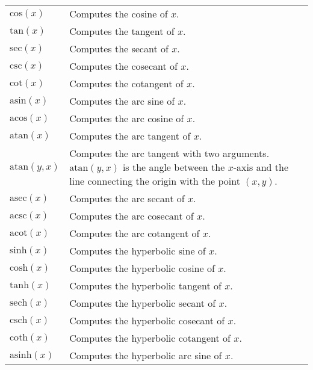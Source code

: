 \documentclass[10pt]{article}
\begin{document}
\begin{longtable}{p{}p{}}
        $ \mathrm{cos}(x) $                        & Computes the cosine of $ x $. \\
        $ \mathrm{tan}(x) $                        & Computes the tangent of $ x $. \\
        $ \mathrm{sec}(x) $                        & Computes the secant of $ x $. \\
        $ \mathrm{csc}(x) $                        & Computes the cosecant of $ x $. \\
        $ \mathrm{cot}(x) $                        & Computes the cotangent of $ x $. \\
        $ \mathrm{asin}(x) $                       & Computes the arc sine of $ x $. \\
        $ \mathrm{acos}(x) $                       & Computes the arc cosine of $ x $. \\
        $ \mathrm{atan}(x) $                       & Computes the arc tangent of $ x $. \\
        $ \mathrm{atan}(y, x) $                    & Computes the arc tangent with two arguments. $ \mathrm{atan}(y, x) $ is the angle between the $ x $-axis and the line connecting the origin with the point $ (x, y) $. \\
        $ \mathrm{asec}(x) $                       & Computes the arc secant of $ x $. \\
        $ \mathrm{acsc}(x) $                       & Computes the arc cosecant of $ x $. \\
        $ \mathrm{acot}(x) $                       & Computes the arc cotangent of $ x $. \\
        $ \mathrm{sinh}(x) $                       & Computes the hyperbolic sine of $ x $. \\
        $ \mathrm{cosh}(x) $                       & Computes the hyperbolic cosine of $ x $. \\
        $ \mathrm{tanh}(x) $                       & Computes the hyperbolic tangent of $ x $. \\
        $ \mathrm{sech}(x) $                       & Computes the hyperbolic secant of $ x $. \\
        $ \mathrm{csch}(x) $                       & Computes the hyperbolic cosecant of $ x $. \\
        $ \mathrm{coth}(x) $                       & Computes the hyperbolic cotangent of $ x $. \\
        $ \mathrm{asinh}(x) $                      & Computes the hyperbolic arc sine of $ x $. \\

\end{longtable}
\end{document}
